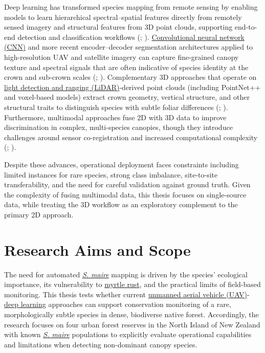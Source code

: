 \documentclass[
]{scrreprt}
\begin{document}
Deep learning has transformed species mapping from remote sensing by
enabling models to learn hierarchical spectral--spatial features
directly from remotely sensed imagery and structural features from 3D
point clouds, supporting end-to-end detection and classification
workflows (;
).
\hyperref[acronyms_CNN]{Convolutional neural network (CNN)} and more
recent encoder--decoder segmentation architectures applied to
high-resolution UAV and satellite imagery can capture fine-grained
canopy texture and spectral signals that are often indicative of species
identity at the crown and sub-crown scales
(; ). Complementary 3D approaches that operate on
\hyperref[acronyms_LiDAR]{light detection and ranging (LiDAR)}-derived
point clouds (including PointNet++ and voxel-based models) extract crown
geometry, vertical structure, and other structural traits to distinguish
species with subtle foliar differences
(;
). Furthermore, multimodal
approaches fuse 2D with 3D data to improve discrimination in complex,
multi-species canopies, though they introduce challenges around sensor
co-registration and increased computational complexity
(;
).

Despite these advances, operational deployment faces constraints
including limited instances for rare species, strong class imbalance,
site-to-site transferability, and the need for careful validation
against ground truth. Given the complexity of fusing multimodal data,
this thesis focuses on single-source data, while treating the 3D
workflow as an exploratory complement to the primary 2D approach.

\section{Research Aims and Scope}\label{research-aims-and-scope}

The need for automated \hyperref[acronyms_SM]{\emph{S. maire}} mapping
is driven by the species' ecological importance, its vulnerability to
\hyperref[acronyms_MR]{myrtle rust}, and the practical limits of
field-based monitoring. This thesis tests whether current
\hyperref[acronyms_UAV]{unmanned aerial
vehicle (UAV)}-\hyperref[acronyms_DL]{deep learning} approaches can
support conservation monitoring of a rare, morphologically subtle
species in dense, biodiverse native forest. Accordingly, the research
focuses on four urban forest reserves in the North Island of New Zealand
with known \hyperref[acronyms_SM]{\emph{S. maire}} populations to
explicitly evaluate operational capabilities and limitations when
detecting non-dominant canopy species.
\end{document}
